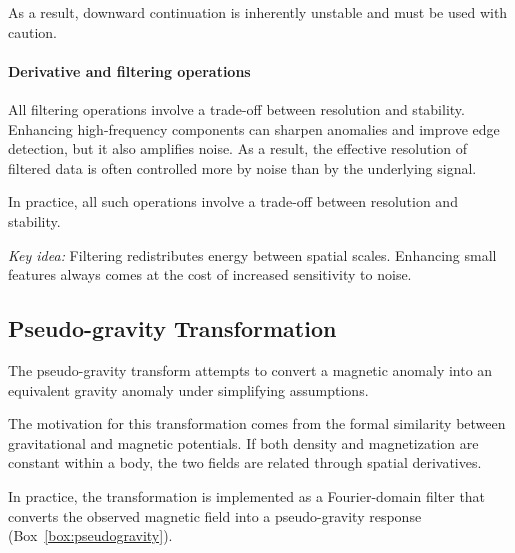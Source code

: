 As a result, downward continuation is inherently unstable and must be used with caution.

\paragraph{Derivative and filtering operations}

All filtering operations involve a trade-off between resolution and stability. Enhancing high-frequency components can sharpen anomalies and improve edge detection, but it also amplifies noise. As a result, the effective resolution of filtered data is often controlled more by noise than by the underlying signal.

In practice, all such operations involve a trade-off between resolution and stability.

\emph{Key idea:} Filtering redistributes energy between spatial scales. Enhancing small features always comes at the cost of increased sensitivity to noise.

\subsection{Pseudo-gravity Transformation}

The pseudo-gravity transform attempts to convert a magnetic anomaly into an equivalent gravity anomaly under simplifying assumptions.

The motivation for this transformation comes from the formal similarity between gravitational and magnetic potentials. If both density and magnetization are constant within a body, the two fields are related through spatial derivatives.

In practice, the transformation is implemented as a Fourier-domain filter that converts the observed magnetic field into a pseudo-gravity response (Box~\ref{box:pseudogravity}).

